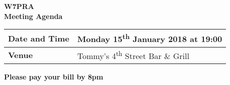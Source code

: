 \documentclass[letter,11pt]{extarticle}
\begin{document}
	\thispagestyle{empty}
	
	\begin{center}
		\textbf{W7PRA\\Meeting Agenda}
		\vspace{0.33cm}
	\end{center}
	
	\begin{center}
		\begin{tabular}{| m{3.0cm} | m{7.5cm} |} \hline
			\textbf{Date and Time} & Monday 15\textsuperscript{th} January 2018 at 19:00 \\ \hline
			\textbf{Venue} & Tommy's 4\textsuperscript{th} Street Bar \& Grill \\ \hline
				\end{tabular}
	\end{center}
	
	\begin{center}
		\textbf{Please pay your bill by 8pm}
	\end{center}
	
\end{document}
